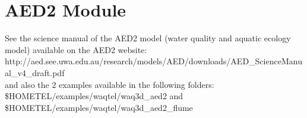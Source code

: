 \chapter{AED2 Module}

See the science manual of the AED2 model (water quality and aquatic ecology model)
available on the AED2 website:\\

http://aed.see.uwa.edu.au/research/models/AED/downloads/AED\_ScienceManual\_v4\_draft.pdf
\\

and also the 2 examples available in the following folders:\\

\$HOMETEL/examples/waqtel/waq3d\_aed2 and \$HOMETEL/examples/waqtel/waq3d\_aed2\_flume
